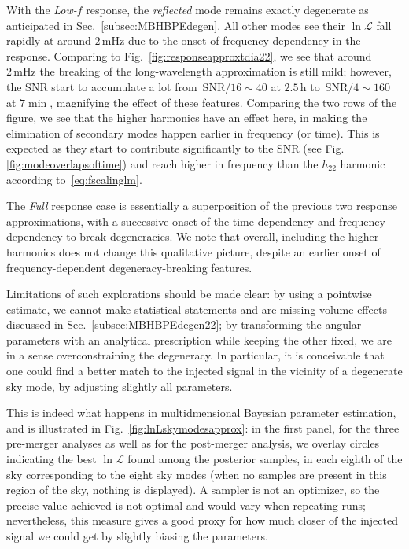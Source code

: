 \documentclass[aps,showpacs,twocolumn,prd,superscriptaddress,nofootinbib]{revtex4-1}
\newcommand\calL{{\mathcal{L}}}
\newcommand{\SNR}{\,\mathrm{SNR}}
\newcommand{\mHz}{\,\mathrm{mHz}}
\begin{document}
With the \textit{Low-$f$} response, the \textit{reflected} mode remains exactly degenerate as anticipated in Sec.~\ref{subsec:MBHBPEdegen}. All other modes see their $\ln \calL$ fall rapidly at around $2\mHz$ due to the onset of frequency-dependency in the response. Comparing to Fig.~\ref{fig:responseapproxtdia22}, we see that around $2\mHz$ the breaking of the long-wavelength approximation is still mild; however, the SNR start to accumulate a lot from $\SNR/16 \sim 40$ at $2.5\, \mathrm{h}$ to $\SNR/4 \sim 160$ at $7\min$, magnifying the effect of these features. Comparing the two rows of the figure, we see that the higher harmonics have an effect here, in making the elimination of secondary modes happen earlier in frequency (or time). This is expected as they start to contribute significantly to the SNR (see Fig.\ref{fig:modeoverlapsoftime}) and reach higher in frequency than the $h_{22}$ harmonic according to~\eqref{eq:fscalinglm}.

The \textit{Full} response case is essentially a superposition of the previous two response approximations, with a successive onset of the time-dependency and frequency-dependency to break degeneracies. We note that overall, including the higher harmonics does not change this qualitative picture, despite an earlier onset of frequency-dependent degeneracy-breaking features.

Limitations of such explorations should be made clear: by using a pointwise estimate, we cannot make statistical statements and are missing volume effects discussed in Sec.~\ref{subsec:MBHBPEdegen22}; by transforming the angular parameters with an analytical prescription while keeping the other fixed, we are in a sense overconstraining the degeneracy. In particular, it is conceivable that one could find a better match to the injected signal in the vicinity of a degenerate sky mode, by adjusting slightly all parameters.

This is indeed what happens in multidmensional Bayesian parameter estimation, and is illustrated in Fig.~\ref{fig:lnLskymodesapprox}: in the first panel, for the three pre-merger analyses as well as for the post-merger analysis, we overlay circles indicating the best $\ln \calL$ found among the posterior samples, in each eighth of the sky corresponding to the eight sky modes (when no samples are present in this region of the sky, nothing is displayed). A sampler is not an optimizer, so the precise value achieved is not optimal and would vary when repeating runs; nevertheless, this measure gives a good proxy for how much closer of the injected signal we could get by slightly biasing the parameters.
\end{document}
